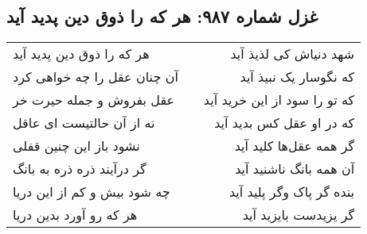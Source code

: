 \begin{center}
\section*{غزل شماره ۹۸۷: هر که را ذوق دین پدید آید}
\label{sec:0987}
\begin{longtable}{l p{0.5cm} r}
هر که را ذوق دین پدید آید
&&
شهد دنیاش کی لذیذ آید
\\
آن چنان عقل را چه خواهی کرد
&&
که نگوسار یک نبیذ آید
\\
عقل بفروش و جمله حیرت خر
&&
که تو را سود از این خرید آید
\\
نه از آن حالتیست ای عاقل
&&
که در او عقل کس بدید آید
\\
نشود باز این چنین قفلی
&&
گر همه عقل‌ها کلید آید
\\
گر درآیند ذره ذره به بانگ
&&
آن همه بانگ ناشنید آید
\\
چه شود بیش و کم از این دریا
&&
بنده گر پاک وگر پلید آید
\\
هر که رو آورد بدین دریا
&&
گر یزیدست بایزید آید
\\
\end{longtable}
\end{center}
